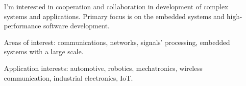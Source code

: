 


\begin{cventries}


\begin{flushleft}

I'm interested in cooperation and collaboration in development of complex systems and applications.
Primary focus is on the embedded systems and high-performance software development.
\newline

Areas of interest: communications, networks, signals' processing, embedded systems with a large scale. 
\newline

Application interests: automotive, robotics, mechatronics, wireless communication, industrial electronics, IoT.
\end{flushleft}
    


\end{cventries}